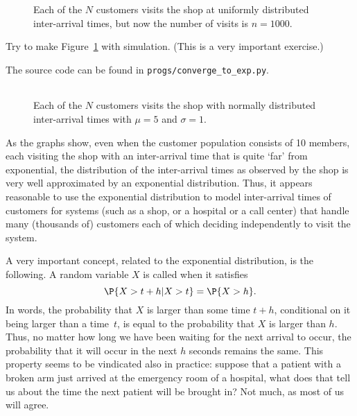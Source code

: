 \begin{figure}[ht]
  \centering
  \begin{tabular}[h]{c}
 \\
  \end{tabular}
  \caption{Each of the $N$ customers visits the shop at uniformly 
    distributed inter-arrival times, but now the number of visits is
    $n=1000$.}  
  \label{fig:uniformmany}
\end{figure}

\begin{exercise}
  Try to make Figure~\ref{fig:uniformmany} with simulation. (This is a very important exercise.)
  \begin{solution}
    The source code can be found in \texttt{progs/converge\_to\_exp.py}.
\end{solution}
\end{exercise}

\begin{figure}[ht]
  \centering
  \begin{tabular}[h]{c}
 
  \end{tabular}
  \caption{Each of the $N$ customers visits the shop with normally
    distributed inter-arrival times with $\mu=5$ and
    $\sigma=1$.}  \label{fig:normal}
\end{figure}

As the graphs show, even when the customer population consists of 10
members, each visiting the shop with an inter-arrival time that is
quite `far' from exponential, the distribution of the inter-arrival
times as observed by the shop is very well approximated by an
exponential distribution. Thus, it appears reasonable to use the
exponential distribution to model inter-arrival times of customers for systems (such as a shop, or a hospital or a call center) that handle many (thousands of)
customers each of which  deciding independently to visit the system.


A very important concept, related to the exponential distribution, is the following. A random variable $X$ is called  when it satisfies
\begin{equation*}
  \P{X > t+h | X>t} = \P{X>h}.
\end{equation*}
In words, the probability that $X$ is larger than some time $t+h$,
conditional on it being larger than a time~$t$, is equal to the
probability that $X$ is larger than $h$. Thus, no matter how long we
have been waiting for the next arrival to occur, the probability that
it will occur in the next $h$ seconds remains the same.  This property
seems to be vindicated also in practice: suppose that a patient with a
broken arm just arrived at the emergency room of a hospital, what does
that tell us about the time the next patient will be brought in? Not
much, as most of us will agree.


